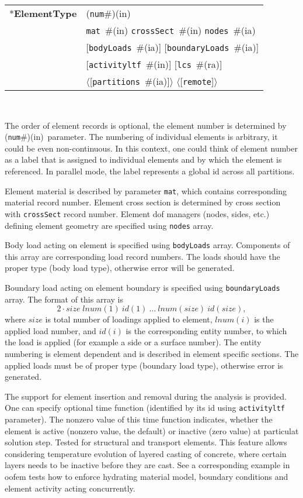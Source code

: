 \documentclass[a4paper]{article}
\newcommand{\param}[1]{\texttt{#1}} %
\newcommand{\optional}[1]{[#1]} %
\newcommand{\field}[2]{\param{#1}~\#{\tiny(#2)}} %
\newcommand{\optField}[2]{\optional{\field{#1}{#2}}}
\newcommand{\optFieldnotype}[1]{[\param{#1}]}
\newcommand{\componentNum}{(\param{num}\#){\tiny(in)}} %
\newcommand{\entKeyword}[1]{*\textbf{#1}} %
\newcommand{\Pmode}[1]{{\sffamily #1}}
\newcommand{\oofemParallel}[1]{$\langle${#1}$\rangle$}
\newcommand{\PoptField}[2]{\oofemParallel{\optField{#1}{#2}}}
\newcommand{\PoptFieldnotype}[1]{\oofemParallel{\optFieldnotype{#1}}}
\newenvironment{record}[1][]{\begin{tabular}{|ll}}{\end{tabular}\\}
\newcommand{\recentry}[2]{{#1}&{#2}\\}
\newcounter{rcc}
\newenvironment{record}[1][\textwidth]{\setcounter{rcc}{0}\rowcolors{1}{lightgray}{lightgray}\tabularx{#1}{llR} \hline}
               {\endtabularx}
\newcommand{\recentry}[2]{\ifthenelse{\value{rcc}>0}{$\backslash$ \\}{\setcounter{rcc}{1}}{#1}&{#2}&}
\begin{document}
\noindent
\begin{record}
  \recentry{\entKeyword{ElementType}}{\componentNum}
  \recentry{}{\field{mat}{in} \field{crossSect}{in} \field{nodes}{ia}}
  \recentry{}{\optField{bodyLoads}{ia} \optField{boundaryLoads}{ia}}
  \recentry{}{\optField{activityltf}{in} \optField{lcs}{ra}}
  \recentry{}{\PoptField{partitions}{ia} \PoptFieldnotype{remote}}
\end{record}

The order of element records is optional, the element number is determined by \componentNum\ parameter.
The numbering of individual elements is arbitrary, it could be even non-continuous. In this context, one could think of element number as a label that is assigned to individual elements and by which the element is referenced.
\Pmode{In parallel mode, the label represents a global id across all partitions.}

Element
material is described by parameter \param{mat}, which contains corresponding
material record number. Element cross
section is determined by cross section  with  \param{crossSect}
record number. Element dof managers (nodes, sides, etc.) defining element geometry are specified using
\param{nodes} array.

Body load acting on element is specified using \param{bodyLoads} array. Components
of this array are corresponding load record numbers. The loads should
have the proper type (body load type), otherwise error will be generated.

Boundary load acting on element boundary is specified using
\param{boundaryLoads} array. The format of this array is
\begin{displaymath}
2\cdot size \; lnum(1)~id(1)~\dots~lnum(size)~id(size),
\end{displaymath}
where $size$ is total number of loadings applied to element,
$lnum(i)$ is the applied load number, and $id(i)$
is the corresponding entity number, to which the load is applied (for example
a side or a surface number). The entity numbering is element dependent and
is described in element specific sections. The applied loads must be
of proper type (boundary load type), otherwise error is generated.

The support for element insertion and removal during the analysis is provided. One can specify optional time function (identified by its id using \param{activityltf} parameter). The nonzero value of this time function indicates, whether the element is active (nonzero value, the default) or inactive (zero value) at particulat solution step. Tested for structural and transport elements. This feature allows considering temperature evolution of layered casting of concrete, where certain layers needs to be inactive before they are cast. See a corresponding example in oofem
tests how to enforce hydrating material model, boundary conditions and element activity acting concurrently.
\end{document}
